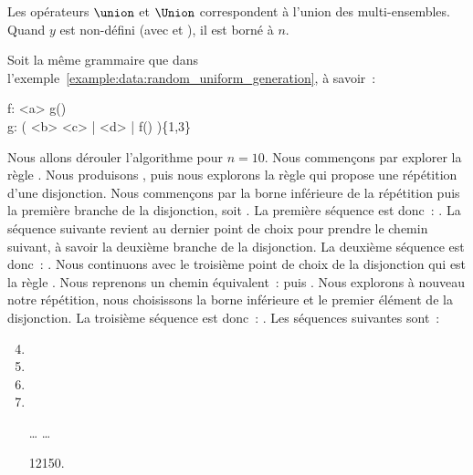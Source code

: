 Les opérateurs $\union$ et $\Union$ correspondent à l'union des multi-ensembles.
Quand $y$ est non-défini (avec \code{*} et \code{+}), il est borné à $n$.

\begin{example}
\label{example:data:bounded_exhaustive_generation}

Soit la même grammaire que dans
l'exemple~\ref{example:data:random_uniform_generation}, à savoir~:

\begin{pre}
f: <a> g() \\
g: ( <b> <c> | <d> | f() )\{1,3\}
\end{pre}

Nous allons dérouler l'algorithme pour $n = 10$. Nous commençons par explorer la
règle . Nous produisons , puis nous explorons la règle
 qui propose une répétition d'une disjonction.  Nous commençons par la
borne inférieure de la répétition puis la première branche de la disjonction,
soit . La première séquence est donc~: . La
séquence suivante revient au dernier point de choix pour prendre le chemin
suivant, à savoir la deuxième branche de la disjonction. La deuxième séquence
est donc~: . Nous continuons avec le troisième point de choix de
la disjonction qui est la règle . Nous reprenons un chemin équivalent~:
 puis . Nous explorons à nouveau notre répétition, nous
choisissons la borne inférieure et le premier élément de la disjonction. La
troisième séquence est donc~: . Les séquences suivantes
sont~:

\begin{enumerate}
\setcounter{enumi}{3}

\item {}

\item {}

\item {}

\item {}

\item[…] …

\item[12150.] 

\end{enumerate}

\end{example}

